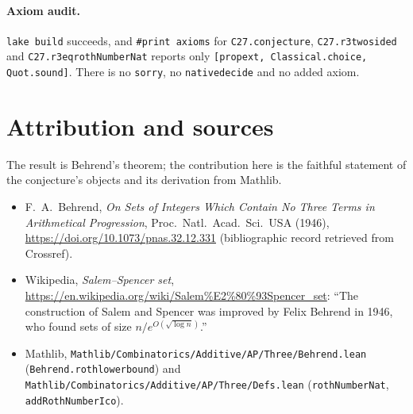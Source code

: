 \documentclass[11pt]{article}
\theoremstyle{definition}
\theoremstyle{remark}
\renewcommand{\_}{\oldus\allowbreak}
\begin{document}
\paragraph{Axiom audit.} \texttt{lake build} succeeds, and \texttt{\#print axioms} for
\texttt{C27.conjecture\_27}, \texttt{C27.r3\_two\_sided} and \texttt{C27.r3\_eq\_rothNumberNat} reports
only \texttt{[propext, Classical.choice, Quot.sound]}. There is no \texttt{sorry}, no
\texttt{native\_decide} and no added axiom.

\section*{Attribution and sources}

The result is Behrend's theorem; the contribution here is the faithful statement of the conjecture's
objects and its derivation from Mathlib.
\begin{itemize}
\item F.~A.~Behrend, \emph{On Sets of Integers Which Contain No Three Terms in Arithmetical
Progression}, Proc.\ Natl.\ Acad.\ Sci.\ USA (1946), \url{https://doi.org/10.1073/pnas.32.12.331}
(bibliographic record retrieved from Crossref).
\item Wikipedia, \emph{Salem--Spencer set}, \url{https://en.wikipedia.org/wiki/Salem\%E2\%80\%93Spencer_set}:
``The construction of Salem and Spencer was improved by Felix Behrend in 1946, who found sets of size
$n/e^{O(\sqrt{\log n})}$.''
\item Mathlib, \texttt{Mathlib/Combinatorics/Additive/AP/Three/Behrend.lean} (\texttt{Behrend.roth\_lower\_bound})
and \texttt{Mathlib/Combinatorics/Additive/AP/Three/Defs.lean} (\texttt{rothNumberNat}, \texttt{addRothNumber\_Ico}).
\end{itemize}
\end{document}
